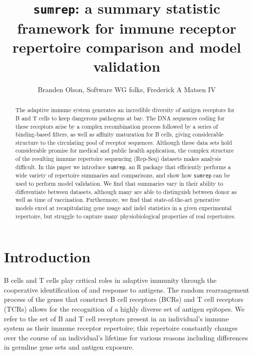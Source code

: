 \documentclass{article}
\title{\texttt{sumrep}: a summary statistic framework for immune receptor repertoire comparison and model validation}
\author{Branden Olson, Software WG folks, Frederick A Matsen IV}
\newcommand{\igor}{\texttt{IGoR}}
\begin{document}

\maketitle

\begin{abstract}
The adaptive immune system generates an incredible diversity of antigen receptors for B and T cells to keep dangerous pathogens at bay.
The DNA sequences coding for these receptors arise by a complex recombination process followed by a series of binding-based filters, as well as affinity maturation for B cells, giving considerable structure to the circulating pool of receptor sequences.
Although these data sets hold considerable promise for medical and public health application, the complex structure of the resulting immune repertoire sequencing (Rep-Seq) datasets makes analysis difficult.
In this paper we introduce \texttt{sumrep}, an R package that efficiently performs a wide variety of repertoire summaries and comparisons, and show how \texttt{sumrep} can be used to perform model validation.
We find that summaries vary in their ability to differentiate between datasets, although many are able to distinguish between donor as well as time of vaccination.
Furthermore, we find that state-of-the-art generative models excel at recapitulating gene usage and indel statistics in a given experimental repertoire, but struggle to capture many physiobiological properties of real repertoires.
\end{abstract}


\section*{Introduction}

B cells and T cells play critical roles in adaptive immunity through the cooperative identification of and response to antigens.
The random rearrangement process of the genes that construct B cell receptors (BCRs) and T cell receptors (TCRs) allows for the recognition of a highly diverse set of antigen epitopes.
We refer to the set of B and T cell receptors present in an individual's immune system as their immune receptor repertoire; this repertoire constantly changes over the course of an individual's lifetime for various reasons including differences in germline gene sets and antigen exposure.
\end{document}
